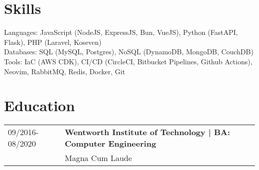 \documentclass[a4paper,10pt]{article}
\begin{document}
\section*{\textcolor{blueishgray}{Skills}}
Languages: JavaScript (NodeJS, ExpressJS, Bun, VueJS), Python (FastAPI, Flask), PHP (Laravel, Koseven) \\
Databases: SQL (MySQL, Postgres), NoSQL (DynamoDB, MongoDB, CouchDB) \\
Tools: IaC (AWS CDK), CI/CD (CircleCI, Bitbucket Pipelines, Github Actions), Neovim, RabbitMQ, Redis, Docker, Git

\section*{\textcolor{blueishgray}{Education}}
\begin{tabularx}{\linewidth}{l|>{\raggedright\arraybackslash}X}
    {\small \textcolor{datecolor}{09/2016-08/2020}} & \textbf{\textcolor{blueishgray}{Wentworth Institute of Technology} | BA: Computer Engineering} \\  & Magna Cum Laude
\end{tabularx}
\end{document}
